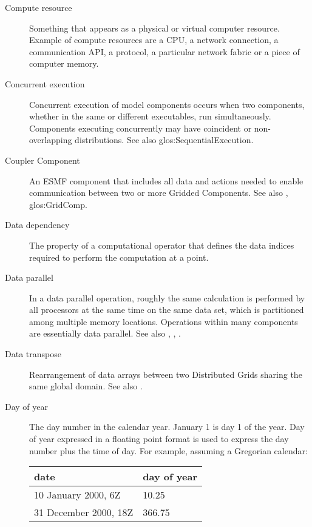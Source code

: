 \begin{description}
\item[Compute resource] \label{glos:CompResource} Something that appears as a
  physical or virtual computer resource. Example of compute resources
  are a CPU, a network connection, a communication API, a protocol, a 
  particular network fabric or a piece of computer memory. 

\item[Concurrent execution] \label{glos:ConcurrentExecution} 
  Concurrent execution of model components occurs when two components,
  whether in the same or different executables, run simultaneously.
  Components executing concurrently may have coincident or 
  non-overlapping distributions.  See also 
  {glos:SequentialExecution}.

\item[Coupler Component] \label{glos:Coupler}
  An ESMF component that includes all data and actions needed to enable 
  communication between two or more Gridded Components. 
  See also , 
  {glos:GridComp}.

\item[Data dependency] \label{glos:DataDep} The property of a computational
  operator that defines the data indices required to perform
  the computation at a point.  

\item[Data parallel] \label{glos:DataParallel} In a data parallel operation,
  roughly the same calculation is performed by all processors at the same 
  time on the same data set, which is partitioned among multiple memory 
  locations.  Operations within many components are essentially data 
  parallel.  See also , , 
  . 

\item[Data transpose] \label{glos:DataTranspose} Rearrangement of data 
  arrays 
  between two Distributed Grids sharing the same global domain.
  See also .

\item[Day of year] \label{glos:DayOfYear} The day number in the calendar year. 
  January 1 is day 1 of the year. Day of year expressed in a floating point 
  format is used to express the day number plus the time of day. 
  For example, assuming a Gregorian calendar:

\begin{tabular}{ll}
  {\bf date}              & {\bf day of year} \\
  \hline 
  10 January 2000, 6Z     & 10.25 \\
  31 December 2000, 18Z   & 366.75 
\end{tabular}


\end{description}
